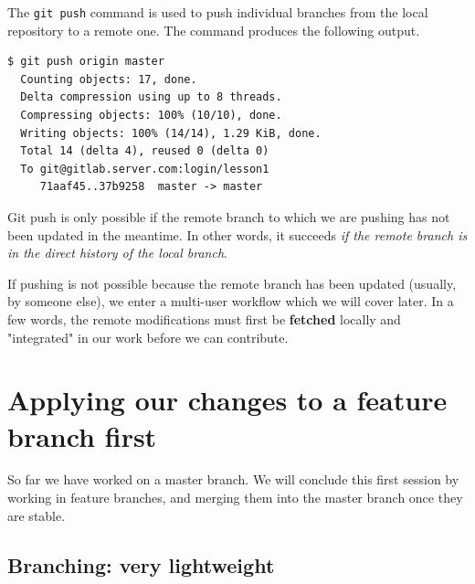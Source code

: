 \documentclass{tufte-handout}
\begin{document}
The \texttt{git push} command is used to push individual branches from the local repository to a remote one.
The command produces the following output.

\begin{lstlisting}[style=BashInputStyle]
  $ git push origin master 
  Counting objects: 17, done.
  Delta compression using up to 8 threads.
  Compressing objects: 100% (10/10), done.
  Writing objects: 100% (14/14), 1.29 KiB, done.
  Total 14 (delta 4), reused 0 (delta 0)
  To git@gitlab.server.com:login/lesson1
     71aaf45..37b9258  master -> master
\end{lstlisting}

Git push is only possible if the remote branch to which we are pushing has not been updated in the meantime.
In other words, it succeeds \textit{if the remote branch is in the direct history of the local branch}.

If pushing is not possible because the remote branch has been updated (usually, by someone else), we enter a multi-user workflow which we will cover later.
In a few words, the remote modifications must first be \textbf{fetched} locally and "integrated" in our work before we can contribute.

\section{Applying our changes to a feature branch first}

So far we have worked on a master branch.
We will conclude this first session by working in feature branches, and merging them into the master branch once they are stable.

\subsection{Branching: very lightweight}
\end{document}
